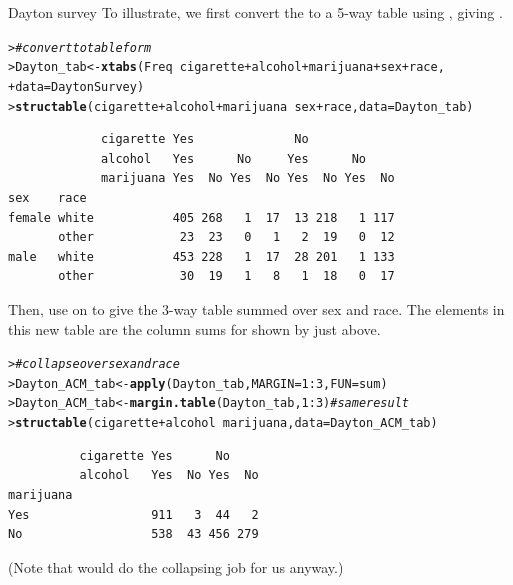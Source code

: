 \documentclass[10pt,krantz2]{krantz}\usepackage[]{graphicx}\usepackage[]{color}
\makeatletter
\newcommand{\hlnum}[1]{\textcolor[rgb]{0.686,0.059,0.569}{#1}}%
\newcommand{\hlcom}[1]{\textcolor[rgb]{0.678,0.584,0.686}{\textit{#1}}}%
\newcommand{\hlopt}[1]{\textcolor[rgb]{0,0,0}{#1}}%
\newcommand{\hlstd}[1]{\textcolor[rgb]{0.345,0.345,0.345}{#1}}%
\newcommand{\hlkwb}[1]{\textcolor[rgb]{0.69,0.353,0.396}{#1}}%
\newcommand{\hlkwc}[1]{\textcolor[rgb]{0.333,0.667,0.333}{#1}}%
\newcommand{\hlkwd}[1]{\textcolor[rgb]{0.737,0.353,0.396}{\textbf{#1}}}%
\newenvironment{kframe}{%
 \def\at@end@of@kframe{}%
 \ifinner\ifhmode%
  \def\at@end@of@kframe{\end{minipage}}%
  \begin{minipage}{\columnwidth}%
 \fi\fi%
 \def\FrameCommand##1{\hskip\@totalleftmargin \hskip-\fboxsep
 \colorbox{shadecolor}{##1}\hskip-\fboxsep
     \hskip-\linewidth \hskip-\@totalleftmargin \hskip\columnwidth}%
 \MakeFramed {\advance\hsize-\width
   \@totalleftmargin\z@ \linewidth\hsize
   \@setminipage}}%
 {\par\unskip\endMakeFramed%
 \at@end@of@kframe}
\newenvironment{knitrout}{}{} %
\renewenvironment{knitrout}{\small\renewcommand{\baselinestretch}{.85}}{} %
\makeatother
\begin{document}
\begin{Example}[dayton2]{Dayton survey}
To illustrate, we first convert the  to a 5-way
table using , giving .

\begin{knitrout}
\color{fgcolor}\begin{kframe}
\begin{alltt}
\hlstd{> }\hlcom{# convert to table form}
\hlstd{> }\hlstd{Dayton_tab} \hlkwb{<-} \hlkwd{xtabs}\hlstd{(Freq} \hlopt{~} \hlstd{cigarette} \hlopt{+} \hlstd{alcohol} \hlopt{+} \hlstd{marijuana} \hlopt{+} \hlstd{sex} \hlopt{+} \hlstd{race,}
\hlstd{+ }                    \hlkwc{data} \hlstd{= DaytonSurvey)}
\hlstd{> }\hlkwd{structable}\hlstd{(cigarette} \hlopt{+} \hlstd{alcohol} \hlopt{+} \hlstd{marijuana} \hlopt{~} \hlstd{sex} \hlopt{+} \hlstd{race,} \hlkwc{data} \hlstd{= Dayton_tab)}
\end{alltt}
\begin{verbatim}
             cigarette Yes              No            
             alcohol   Yes      No     Yes      No    
             marijuana Yes  No Yes  No Yes  No Yes  No
sex    race                                           
female white           405 268   1  17  13 218   1 117
       other            23  23   0   1   2  19   0  12
male   white           453 228   1  17  28 201   1 133
       other            30  19   1   8   1  18   0  17
\end{verbatim}
\end{kframe}
\end{knitrout}
Then, use  on  to give the
3-way table  summed over sex and race.
The elements in this new table are the column sums for
 shown by  just above.

\begin{knitrout}
\color{fgcolor}\begin{kframe}
\begin{alltt}
\hlstd{> }\hlcom{# collapse over sex and race}
\hlstd{> }\hlstd{Dayton_ACM_tab} \hlkwb{<-} \hlkwd{apply}\hlstd{(Dayton_tab,} \hlkwc{MARGIN} \hlstd{=} \hlnum{1}\hlopt{:}\hlnum{3}\hlstd{,} \hlkwc{FUN} \hlstd{= sum)}
\hlstd{> }\hlstd{Dayton_ACM_tab} \hlkwb{<-} \hlkwd{margin.table}\hlstd{(Dayton_tab,} \hlnum{1}\hlopt{:}\hlnum{3}\hlstd{)}   \hlcom{# same result}
\hlstd{> }\hlkwd{structable}\hlstd{(cigarette} \hlopt{+} \hlstd{alcohol} \hlopt{~} \hlstd{marijuana,} \hlkwc{data} \hlstd{= Dayton_ACM_tab)}
\end{alltt}
\begin{verbatim}
          cigarette Yes      No    
          alcohol   Yes  No Yes  No
marijuana                          
Yes                 911   3  44   2
No                  538  43 456 279
\end{verbatim}
\end{kframe}
\end{knitrout}
\end{Example}
\noindent (Note that  would do the collapsing job for
us anyway.)
\end{document}
